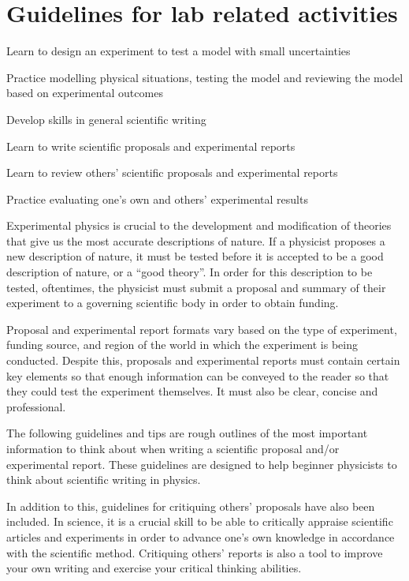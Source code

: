 
\chapter{Guidelines for lab related activities}
\label{chapter:labs}


\begin{learningObjectives}{
 \item Learn to design an experiment to test a model with small uncertainties
 \item Practice modelling physical situations, testing the model and reviewing the model based on experimental outcomes
 \item Develop skills in general scientific writing 
 \item Learn to write scientific proposals and experimental reports
 \item Learn to review others' scientific proposals and experimental reports
 \item Practice evaluating one's own and others' experimental results
 }
\end{learningObjectives}


Experimental physics is crucial to the development and modification of theories that give us the most accurate descriptions of nature. If a physicist proposes a new description of nature, it must be tested before it is accepted to be a good description of nature, or a ``good theory''. In order for this description to be tested, oftentimes, the physicist must submit a proposal and summary of their experiment to a governing scientific body in order to obtain funding. 

Proposal and experimental report formats vary based on the type of experiment, funding source, and region of the world in which the experiment is being conducted. Despite this, proposals and experimental reports must contain certain key elements so that enough information can be conveyed to the reader so that they could test the experiment themselves. It must also be clear, concise and professional. 

The following guidelines and tips are rough outlines of the most important information to think about when writing a scientific proposal and/or experimental report. These guidelines are designed to help beginner physicists to think about scientific writing in physics. 

In addition to this, guidelines for critiquing others' proposals have also been included. In science, it is a crucial skill to be able to critically appraise scientific articles and experiments in order to advance one's own knowledge in accordance with the scientific method. Critiquing others' reports is also a tool to improve your own writing and exercise your critical thinking abilities.  

